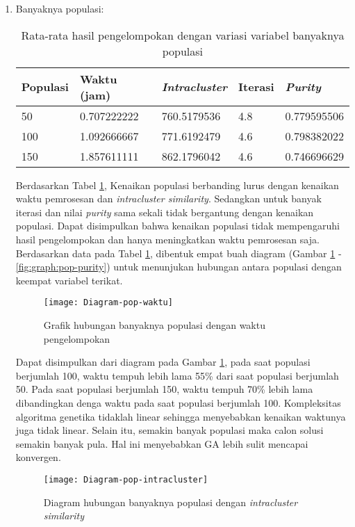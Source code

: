 \begin{enumerate}
	\item Banyaknya populasi:
		\begin{table}[H]
			\centering
			\caption{Rata-rata hasil pengelompokan dengan variasi variabel banyaknya populasi}
			\begin{tabular}{|l|l|l|l|l|} \hline
				Populasi & Waktu (jam) & \textit{Intracluster} & Iterasi& \textit{Purity} \\ \hline
				50  & 0.707222222 & 760.5179536 & 4.8 & 0.779595506 \\ \hline
				100 & 1.092666667 & 771.6192479 & 4.6 & 0.798382022 \\ \hline
				150 & 1.857611111 & 862.1796042 & 4.6 & 0.746696629 \\ \hline
			\end{tabular}
			\label{tbl:exp-pop}
		\end{table}
		
		Berdasarkan Tabel \ref{tbl:exp-pop}, Kenaikan populasi berbanding lurus dengan kenaikan waktu pemrosesan dan \textit{intracluster similarity}. Sedangkan untuk banyak iterasi dan nilai \textit{purity} sama sekali tidak bergantung dengan kenaikan populasi. Dapat disimpulkan bahwa kenaikan populasi tidak mempengaruhi hasil pengelompokan dan hanya meningkatkan waktu pemrosesan saja. Berdasarkan data pada Tabel \ref{tbl:exp-pop}, dibentuk empat buah diagram (Gambar \ref{fig:graph:pop-time} - \ref{fig:graph:pop-purity}) untuk menunjukan hubungan antara populasi dengan keempat variabel terikat.
		
		\begin{figure}[H]
			\centering
			\texttt{[image: Diagram-pop-waktu]}
			\caption{Grafik hubungan banyaknya populasi dengan waktu pengelompokan}
			\label{fig:graph:pop-time}
		\end{figure}
		
		Dapat disimpulkan dari diagram pada Gambar \ref{fig:graph:pop-time}, pada saat populasi berjumlah 100, waktu tempuh lebih lama 55\% dari saat populasi berjumlah 50. Pada saat populasi berjumlah 150, waktu tempuh 70\% lebih lama dibandingkan denga waktu pada saat populasi berjumlah 100. Kompleksitas algoritma genetika tidaklah linear sehingga menyebabkan kenaikan waktunya juga tidak linear. Selain itu, semakin banyak populasi maka calon solusi semakin banyak pula. Hal ini menyebabkan GA lebih sulit mencapai konvergen.
		
		\begin{figure}[H]
			\centering
			\texttt{[image: Diagram-pop-intracluster]}
			\caption{Diagram hubungan banyaknya populasi dengan \textit{intracluster similarity}}
			\label{fig:graph:pop-intra}
		\end{figure}
		

\end{enumerate}
